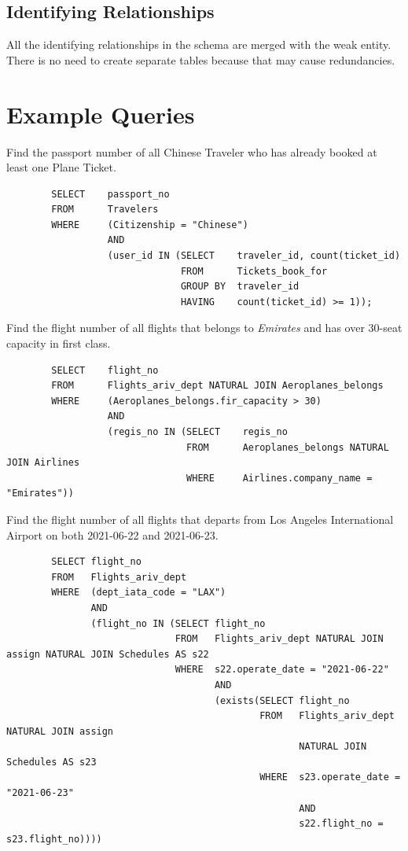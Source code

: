 \documentclass{article}
\begin{document}
	\subsection{Identifying Relationships}
	
	All the identifying relationships in the schema are merged with the weak entity. There is no need to create separate tables because that may cause redundancies.

	
	\section{Example Queries}
	
	\noindent Find the passport number of all Chinese Traveler who has already booked at least one Plane Ticket. 
	\begin{verbatim}
		SELECT    passport_no 
		FROM      Travelers
		WHERE     (Citizenship = "Chinese") 
		          AND 
		          (user_id IN (SELECT    traveler_id, count(ticket_id)
		                       FROM      Tickets_book_for
		                       GROUP BY  traveler_id
		                       HAVING    count(ticket_id) >= 1));
	\end{verbatim}
    
	\noindent Find the flight number of all flights that belongs to \textit{Emirates} and has over 30-seat capacity in first class. 
	\begin{verbatim}
		SELECT    flight_no
		FROM      Flights_ariv_dept NATURAL JOIN Aeroplanes_belongs
		WHERE     (Aeroplanes_belongs.fir_capacity > 30) 
		          AND
		          (regis_no IN (SELECT    regis_no
		                        FROM      Aeroplanes_belongs NATURAL JOIN Airlines
		                        WHERE     Airlines.company_name = "Emirates"))               
	\end{verbatim}
	
	\noindent Find the flight number of all flights that departs from Los Angeles International Airport on both 2021-06-22 and 2021-06-23.
	\begin{verbatim}
		SELECT flight_no
		FROM   Flights_ariv_dept
		WHERE  (dept_iata_code = "LAX")
		       AND 
		       (flight_no IN (SELECT flight_no
		                      FROM   Flights_ariv_dept NATURAL JOIN assign NATURAL JOIN Schedules AS s22
		                      WHERE  s22.operate_date = "2021-06-22"
		                             AND
		                             (exists(SELECT flight_no
		                                     FROM   Flights_ariv_dept NATURAL JOIN assign 
		                                            NATURAL JOIN Schedules AS s23
		                                     WHERE  s23.operate_date = "2021-06-23"
		                                            AND
		                                            s22.flight_no = s23.flight_no))))     
	\end{verbatim}
	
\end{document}
